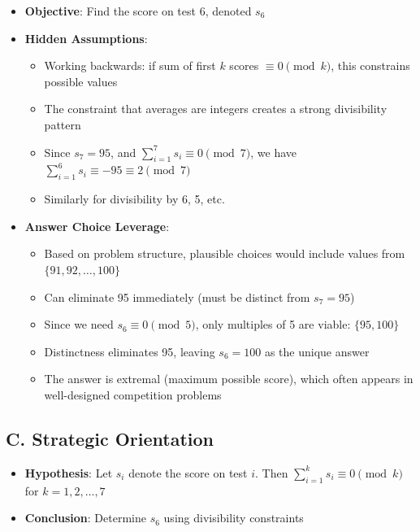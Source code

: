 \documentclass[11pt]{article}
\begin{document}
\begin{problemconfigbox}
\begin{itemize}[leftmargin=*]
    \item \textbf{Objective}: Find the score on test 6, denoted $s_6$
    
    \item \textbf{Hidden Assumptions}: 
    \begin{itemize}
        \item Working backwards: if sum of first $k$ scores $\equiv 0 \pmod{k}$, this constrains possible values
        \item The constraint that averages are integers creates a strong divisibility pattern
        \item Since $s_7 = 95$, and $\sum_{i=1}^{7} s_i \equiv 0 \pmod{7}$, we have $\sum_{i=1}^{6} s_i \equiv -95 \equiv 2 \pmod{7}$
        \item Similarly for divisibility by 6, 5, etc.
    \end{itemize}
    
    \item \textbf{Answer Choice Leverage}: 
    \begin{itemize}
        \item Based on problem structure, plausible choices would include values from $\{91, 92, \ldots, 100\}$
        \item Can eliminate 95 immediately (must be distinct from $s_7 = 95$)
        \item Since we need $s_6 \equiv 0 \pmod{5}$, only multiples of 5 are viable: $\{95, 100\}$
        \item Distinctness eliminates 95, leaving $s_6 = 100$ as the unique answer
        \item The answer is extremal (maximum possible score), which often appears in well-designed competition problems
    \end{itemize}
\end{itemize}

\subsection*{C. Strategic Orientation}
\begin{itemize}[leftmargin=*]
    \item \textbf{Hypothesis}: Let $s_i$ denote the score on test $i$. Then $\sum_{i=1}^{k} s_i \equiv 0 \pmod{k}$ for $k = 1, 2, \ldots, 7$
    
    \item \textbf{Conclusion}: Determine $s_6$ using divisibility constraints
    

\end{itemize}
\end{problemconfigbox}
\end{document}
